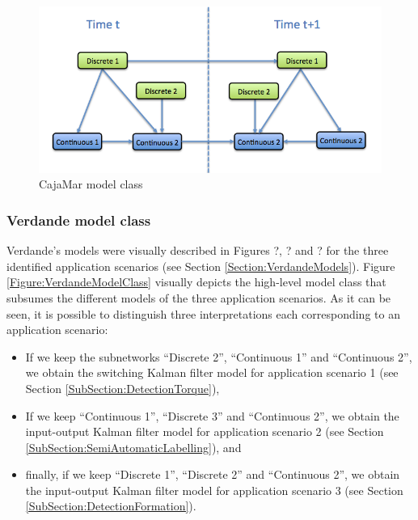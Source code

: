 \begin{figure}[ht!]
\begin{center}
\includegraphics[scale=0.4]{./figures/CajaMarModelClass}
\caption{\label{Figure:CajaMarModelClass} CajaMar model class}
\end{center}
\end{figure}

\subsubsection{Verdande model class}

Verdande's models were visually described in Figures ?, ? and ? for the three identified application scenarios (see Section \ref{Section:VerdandeModels}). Figure \ref{Figure:VerdandeModelClass} visually depicts the high-level model class that subsumes the different models of the three application scenarios. As it can be seen, it is possible to distinguish three interpretations each corresponding to an application scenario:

\begin{itemize}
\item If we keep the subnetworks ``Discrete 2'', ``Continuous 1'' and ``Continuous 2'', we obtain the switching Kalman filter model for application scenario 1 (see Section \ref{SubSection:DetectionTorque}),
\item If we keep ``Continuous 1'', ``Discrete 3'' and ``Continuous 2'', we obtain the input-output Kalman filter model for application scenario 2 (see Section \ref{SubSection:SemiAutomaticLabelling}), and
\item finally, if we keep ``Discrete 1'', ``Discrete 2'' and ``Continuous 2'', we obtain the input-output Kalman filter model for application scenario 3  (see Section \ref{SubSection:DetectionFormation}).
\end{itemize}


